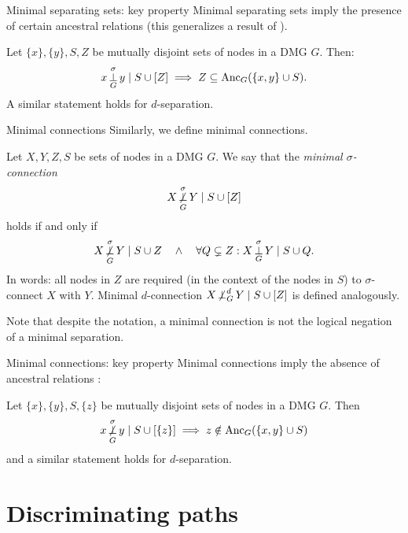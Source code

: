 \begin{frame}{Minimal separating sets: key property}
Minimal separating sets imply the presence of certain ancestral relations (this generalizes a result of \cite{SMR1999}).
\begin{Prp}[\ref{prp:min_sep}]
Let $\{x\},\{y\},S,Z$ be mutually disjoint sets of nodes in a DMG $G$.
Then:
$$x \operatorname*{\perp}^\sigma_G y \mid S \cup [Z] \implies Z \subseteq \mathrm{Anc}_{G}(\{x, y\} \cup S).$$
A similar statement holds for $d$-separation.
\end{Prp}
\end{frame}

\begin{frame}{Minimal connections}
Similarly, we define minimal connections.
\begin{Def}[\ref{def:min_con}]
Let $X,Y,Z,S$ be sets of nodes in a DMG $G$. 
We say that the \emph{minimal $\sigma$-connection}
  $$X \operatorname*{\not\perp}_G^\sigma Y \mid S \cup [Z]$$
holds if and only if
  $$X \operatorname*{\not\perp}_G^\sigma Y \mid S \cup Z\quad\land\quad \forall Q \subsetneq Z: X \operatorname*{\perp}_G^\sigma Y \mid S \cup Q.$$
In words: all nodes in $Z$ are required (in the context of the nodes in $S$) to $\sigma$-connect $X$ with $Y$.
Minimal $d$-connection $X \operatorname*{\not\perp}_G^d Y \mid S \cup [Z]$ is defined analogously.
\end{Def}
Note that despite the notation, a minimal connection is not the logical negation of a minimal separation.
\end{frame}

\begin{frame}{Minimal connections: key property}
Minimal connections imply the absence of ancestral relations \cite{ClaassenHeskes2011}:
\begin{Prp}[\ref{prp:min_con}]
Let $\{x\},\{y\},S,\{z\}$ be mutually disjoint sets of nodes in a DMG $G$. Then
$$x \operatorname*{\not\perp}_G^\sigma y \mid S \cup [\{z\}] \implies z \notin \mathrm{Anc}_{G}(\{x, y\} \cup S)$$
and a similar statement holds for $d$-separation.
\end{Prp}
\end{frame}


\section{Discriminating paths}
\frame{\sectionpage}

